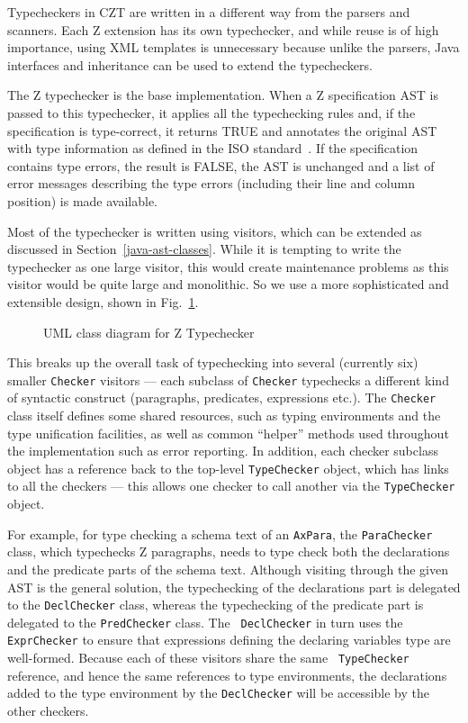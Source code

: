 \documentclass{llncs}
\begin{document}
Typecheckers in CZT are written in a different way from the parsers
and scanners. Each Z extension has its own typechecker, and while reuse
is of high importance, using XML templates is unnecessary because
unlike the parsers, Java interfaces and inheritance can be used to
extend the typecheckers.

The Z typechecker is the base implementation.  When a Z specification
AST is passed to this typechecker, it applies all the typechecking
rules and, if the specification is type-correct, it returns TRUE and
annotates the original AST with type information as defined in the ISO
standard~\cite[Section~10]{isoz}.  If the specification contains type errors,
the result is FALSE, the AST is unchanged and a list of error messages
describing the type errors (including their line and column position)
is made available.

Most of the typechecker is written using visitors, which can be
extended as discussed in Section~\ref{java-ast-classes}.  While it is
tempting to write the typechecker as one large visitor, this would
create maintenance problems as this visitor would be quite large and
monolithic.  So we use a more sophisticated and extensible design,
shown in Fig.~\ref{fig:ztypechecker}.

\def\epsfsize#1#2{0.50#1}
\begin{figure}[t]
\begin{center}
\caption{UML class diagram for Z Typechecker}\label{fig:ztypechecker}
\end{center}
\end{figure}
\def\epsfsize#1#2{\epsfxsize}

This breaks up the overall task of typechecking into several
(currently six) smaller \texttt{Checker} visitors --- each subclass of
\texttt{Checker} typechecks a different kind of syntactic construct
(paragraphs, predicates, expressions etc.).  The \texttt{Checker}
class itself defines some shared resources, such as typing
environments and the type unification facilities, as well as common
``helper'' methods used throughout the implementation such as error
reporting.  In addition, each checker subclass object has a reference
back to the top-level \texttt{TypeChecker} object, which has links to
all the checkers --- this allows one checker to call another via the
\texttt{TypeChecker} object.

For example, for type checking a schema text of an {\tt AxPara}, the
{\tt ParaChecker} class, which typechecks Z paragraphs, needs to type
check both the declarations and the predicate parts of the schema
text.  Although visiting through the given AST is the general
solution, the typechecking of the declarations part is delegated to
the {\tt DeclChecker} class, whereas the typechecking of the predicate
part is delegated to the {\tt PredChecker} class.  The {\tt
DeclChecker} in turn uses the {\tt ExprChecker} to ensure that
expressions defining the declaring variables type are
well-formed. Because each of these visitors share the same {\tt
TypeChecker} reference, and hence the same references to type
environments, the declarations added to the type environment by the
{\tt DeclChecker} will be accessible by the other checkers.
\end{document}
